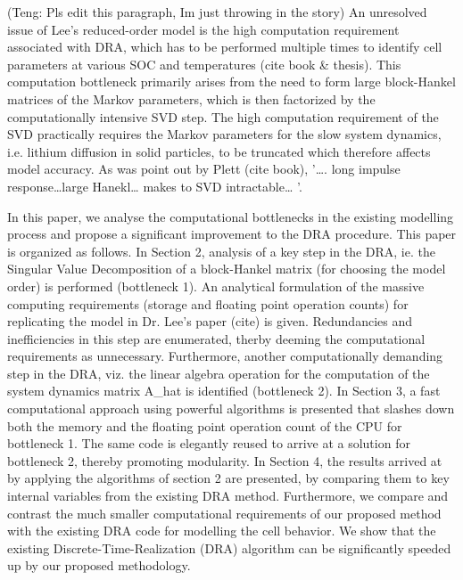 

(Teng: Pls  edit this paragraph,  Im just throwing  in the story)  An unresolved
issue  of  Lee\textquoteright s  reduced-order  model  is the  high  computation
requirement associated  with DRA, which  has to  be performed multiple  times to
identify cell parameters at various SOC  and temperatures (cite book \& thesis).
This  computation  bottleneck primarily  arises  from  the  need to  form  large
block-Hankel matrices of the Markov parameters,  which is then factorized by the
computationally intensive SVD step. The  high computation requirement of the SVD
practically requires  the Markov parameters  for the slow system  dynamics, i.e.
lithium diffusion  in solid particles,  to be truncated which  therefore affects
model accuracy. As  was point out by Plett (cite  book), \textquoteright \dots .
long  impulse response\dots  large Hanekl\dots{}  makes to  SVD intractable\dots
\textquoteright .


In  this  paper,  we  analyse  the computational  bottlenecks  in  the  existing
modelling process  and propose a  significant improvement to the  DRA procedure.
This paper is organized as follows. In Section  2, analysis of a key step in the
DRA, ie. the Singular Value Decomposition of a block-Hankel matrix (for choosing
the model order)  is performed (bottleneck 1). An analytical  formulation of the
massive computing requirements (storage and floating point operation counts) for
replicating  the model  in Dr.  Lee's paper  (cite) is  given. Redundancies  and
inefficiencies in  this step  are enumerated,  therby deeming  the computational
requirements as unnecessary. Furthermore, another computationally demanding step
in the DRA, viz. the linear algebra  operation for the computation of the system
dynamics  matrix A\_hat  is  identified (bottleneck  2). In  Section  3, a  fast
computational approach using powerful algorithms  is presented that slashes down
both the memory and the floating point operation count of the CPU for bottleneck
1. The same code  is elegantly reused to arrive at a  solution for bottleneck 2,
thereby promoting modularity.  In Section 4, the results arrived  at by applying
the algorithms  of section 2  are presented, by  comparing them to  key internal
variables from the existing DRA method. Furthermore, we compare and contrast the
much  smaller  computational  requirements  of  our  proposed  method  with  the
existing DRA  code for modelling  the cell behavior.  We show that  the existing
Discrete-Time-Realization (DRA) algorithm can be significantly speeded up by our
proposed methodology.



